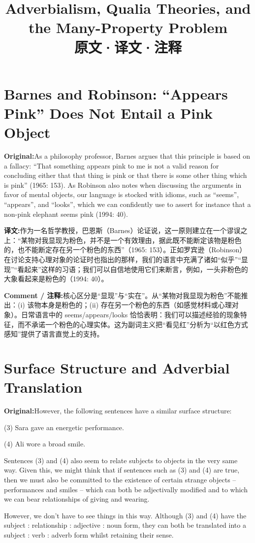 \documentclass[11pt,a4paper]{article}
\title{\textbf{Adverbialism, Qualia Theories, and the Many-Property Problem}\\[6pt]
\large 原文·译文·注释}
\author{}
\date{}
\newcommand{\eng}[1]{\begin{engbox}\noindent\textbf{Original:}\quad #1\end{engbox}}
\newcommand{\cn}[1]{\begin{cnbox}\noindent\textbf{译文:}\quad #1\end{cnbox}}
\newcommand{\cmt}[1]{\begin{commentbox}\noindent\textbf{Comment / 注释:}\quad #1\end{commentbox}}
\begin{document}
\maketitle
\tableofcontents
\newpage

\section{Barnes and Robinson: “Appears Pink” Does Not Entail a Pink Object}

\eng{As a philosophy professor, Barnes argues that this principle is based on a fallacy: “That something appears pink to me is not a valid reason for concluding either that that thing is pink or that there is some other thing which is pink” (1965: 153). As Robinson also notes when discussing the arguments in favor of mental objects, our language is stocked with idioms, such as “seems”, “appears”, and “looks”, which we can confidently use to assert for instance that a non-pink elephant seems pink (1994: 40).}

\cn{作为一名哲学教授，巴恩斯（Barnes）论证说，这一原则建立在一个谬误之上：“某物对我显现为粉色，并不是一个有效理由，据此既不能断定该物是粉色的，也不能断定存在另一个粉色的东西”（1965: 153）。正如罗宾逊（Robinson）在讨论支持心理对象的论证时也指出的那样，我们的语言中充满了诸如“似乎”“显现”“看起来”这样的习语；我们可以自信地使用它们来断言，例如，一头非粉色的大象看起来是粉色的（1994: 40）。}

\cmt{核心区分是“显现”与“实在”。从“某物对我显现为粉色”不能推出：(i) 该物本身是粉色的；(ii) 存在另一个粉色的东西（如感觉材料或心理对象）。日常语言中的 seems/appears/looks 恰恰表明：我们可以描述经验的现象特征，而不承诺一个粉色的心理实体。这为副词主义把“看见红”分析为“以红色方式感知”提供了语言直觉上的支持。}

\section{Surface Structure and Adverbial Translation}

\eng{However, the following sentences have a similar surface structure:

(3) Sara gave an energetic performance.

(4) Ali wore a broad smile.

Sentences (3) and (4) also seem to relate subjects to objects in the very same way. Given this, we might think that if sentences such as (3) and (4) are true, then we must also be committed to the existence of certain strange objects – performances and smiles – which can both be adjectivally modified and to which we can bear relationships of giving and wearing.

However, we don’t have to see things in this way. Although (3) and (4) have the subject : relationship : adjective : noun form, they can both be translated into a subject : verb : adverb form whilst retaining their sense.}
\end{document}
